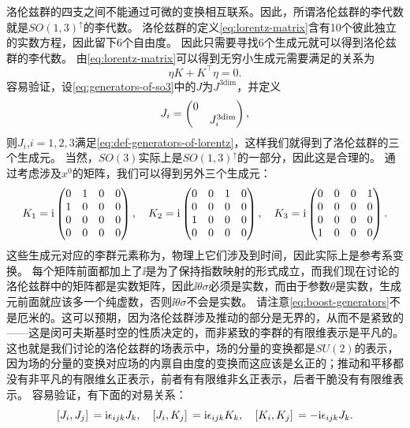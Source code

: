 洛伦兹群的四支之间不能通过可微的变换相互联系。因此，所谓洛伦兹群的李代数就是$SO(1,3)^\uparrow$的李代数。
洛伦兹群的定义\eqref{eq:lorentz-matrix}含有10个彼此独立的实数方程，因此留下6个自由度。
因此只需要寻找6个生成元就可以得到洛伦兹群的李代数。
由\eqref{eq:lorentz-matrix}可以得到无穷小生成元需要满足的关系为
\begin{equation}
    \eta K + K^\top \eta = 0.
    \label{eq:def-generators-of-lorentz}
\end{equation}
容易验证，设\eqref{eq:generators-of-so3}中的$J$为$J^\text{3dim}$，并定义
\begin{equation}
    J_i = \pmqty{\dmat{0 ,J^\text{3dim}_i}},
\end{equation}
则$J_i$,$i=1, 2, 3$满足\eqref{eq:def-generators-of-lorentz}，这样我们就得到了洛伦兹群的三个生成元。
当然，$SO(3)$实际上是$SO(1,3)^\uparrow$的一部分，因此这是合理的。
通过考虑涉及$x^0$的矩阵，我们可以得到另外三个生成元：
\begin{equation}
    K_1 = \ii \pmqty{0 & 1 & 0 & 0 \\ 1 & 0 & 0 & 0 \\ 0 & 0 & 0 & 0 \\ 0 & 0 & 0 & 0}, \quad 
    K_2 = \ii \pmqty{0 & 0 & 1 & 0 \\ 0 & 0 & 0 & 0 \\ 1 & 0 & 0 & 0 \\ 0 & 0 & 0 & 0}, \quad
    K_3 = \ii \pmqty{0 & 0 & 0 & 1 \\ 0 & 0 & 0 & 0 \\ 0 & 0 & 0 & 0 \\ 1 & 0 & 0 & 0}.
    \label{eq:boost-generators}
\end{equation}
这些生成元对应的李群元素称为，物理上它们涉及到时间，因此实际上是参考系变换。
每个矩阵前面都加上了$\ii$是为了保持指数映射的形式成立，而我们现在讨论的洛伦兹群中的矩阵都是实数矩阵，因此$\ii \theta \sigma$必须是实数，而由于参数$\theta$是实数，生成元前面就应该多一个纯虚数，否则$\ii \theta \sigma$不会是实数。
请注意\eqref{eq:boost-generators}不是厄米的。这可以预期，因为洛伦兹群涉及推动的部分是无界的，从而不是紧致的——这是闵可夫斯基时空的性质决定的，而非紧致的李群的有限维表示是平凡的。
这也就是我们讨论的洛伦兹群的场表示中，场的分量的变换都是$SU(2)$的表示，因为场的分量的变换对应场的内禀自由度的变换而这应该是幺正的；推动和平移都没有非平凡的有限维幺正表示，前者有有限维非幺正表示，后者干脆没有有限维表示。
容易验证，有下面的对易关系：
\begin{equation}
    \comm*{J_i}{J_j} = \ii \epsilon_{ijk} J_k, \quad \comm*{J_i}{K_j} = \ii \epsilon_{ijk} K_k, \quad \comm*{K_i}{K_j} = - \ii \epsilon_{ijk} J_k.
    \label{eq:lie-algebra-lorentz}
\end{equation}
